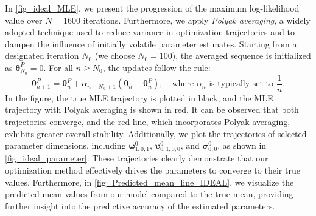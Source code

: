 \documentclass{article}
\def\vsigma{{\bm{\sigma}}}
\def\vomega{{\bm{\omega}}}
\def\vupsilon{{\bm{\upsilon}}}
\def\vtheta{{\bm{\theta}}}
\begin{document}
In \cref{fig_ideal_MLE}, we present the progression of the maximum log-likelihood value over $N=1600$ iterations. Furthermore, we apply \textit{Polyak averaging}, a widely adopted technique used to reduce variance in optimization trajectories and to dampen the influence of initially volatile parameter estimates. Starting from a designated iteration $N_0$ (we choose $N_0 = 100$), the averaged sequence is initialized as $\boldsymbol{\vtheta}_{N_0}^P = 0$. For all $n \geq N_0$, the updates follow the rule:
\[
\boldsymbol{\vtheta}_{n+1}^P = \boldsymbol{\vtheta}_n^P + \alpha_{n - N_0 + 1} \left( \boldsymbol{\vtheta}_n - \boldsymbol{\vtheta}_n^P \right), \quad \text{where } \alpha_n \text{ is typically set to } \frac{1}{n}.
\]
In the figure, the true MLE trajectory is plotted in black, and the MLE trajectory with Polyak averaging is shown in red. It can be observed that both trajectories converge, and the red line, which incorporates Polyak averaging, exhibits greater overall stability. Additionally, we plot the trajectories of selected parameter dimensions, including $\vomega^0_{1,0,1}$, $\vupsilon^0_{0,1,0,0}$, and $\vsigma^0_{0,0}$, as shown in \cref{fig_ideal_parameter}. These trajectories clearly demonstrate that our optimization method effectively drives the parameters to converge to their true values. Furthermore, in \cref{fig_Predicted_mean_line_IDEAL}, we visualize the predicted mean values from our model compared to the true mean, providing further insight into the predictive accuracy of the estimated parameters.
\end{document}

